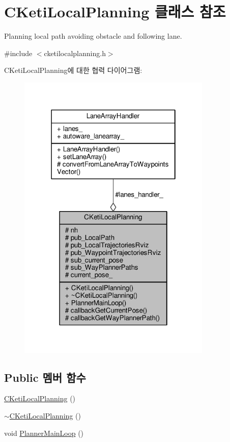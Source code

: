 \hypertarget{class_c_keti_local_planning}{}\section{C\+Keti\+Local\+Planning 클래스 참조}
\label{class_c_keti_local_planning}


Planning local path avoiding obstacle and following lane.  




{\ttfamily \#include $<$cketilocalplanning.\+h$>$}



C\+Keti\+Local\+Planning에 대한 협력 다이어그램\+:\nopagebreak
\begin{figure}[H]
\begin{center}
\leavevmode
\includegraphics[width=262pt]{class_c_keti_local_planning__coll__graph}
\end{center}
\end{figure}
\subsection*{Public 멤버 함수}
\begin{DoxyCompactItemize}
\item 
\hyperlink{class_c_keti_local_planning_a64e789f070f7334aab7727c0ae276931}{C\+Keti\+Local\+Planning} ()
\item 
\hyperlink{class_c_keti_local_planning_adab5b7e3683328d05b50ed802e2fb5cd}{$\sim$\+C\+Keti\+Local\+Planning} ()
\item 
void \hyperlink{class_c_keti_local_planning_a3286318e734e7441036b43cec169978c}{Planner\+Main\+Loop} ()
\end{DoxyCompactItemize}
